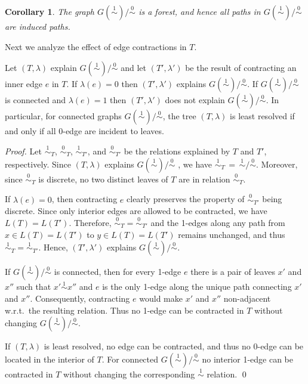 \documentclass[smallextended]{svjour3}
\newcommand{\rev}[1]{\begingroup\color{blue}#1\endgroup}
\newcommand{\Ro}{\mathrel{\overset{0}{\sim}}}
\newcommand{\Rl}{\mathrel{\overset{1}{\sim}}}
\newtheorem{cor}[thm]{Corollary}
\begin{document}
\begin{cor}
  The graph $G(\Rl)/\Ro$ is a forest, and hence all paths in $G(\Rl)/\Ro$
  are induced paths.
  \label{cor:cycle-free}
\end{cor}

Next we analyze the effect of edge contractions in $T$.

\begin{lemma}
  Let $(T,\lambda)$ explain $G(\Rl)/\Ro$ and let $(T',\lambda')$ be the
  result of contracting an \rev{inner} edge  $e$ in $T$. If $\lambda(e)=0$
  then $(T',\lambda')$ explains $G(\Rl)/\Ro$. If $G(\Rl)/\Ro$ is connected
  and $\lambda(e)=1$ then $(T',\lambda')$ does not explain $G(\Rl)/\Ro$.
  In particular, for connected graphs $G(\Rl)/\Ro$, the tree $(T,\lambda)$
  is least resolved if and only if all 0-edge are incident to leaves.
\end{lemma}
\begin{proof}
  Let $\Rl_T$, $\Ro_T$, $\Rl_{T'}$, and $\Ro_{T'}$ be the relations
  explained by $T$ and $T'$, respectively.  Since $(T,\lambda)$ explains
  $G(\Rl)/\Ro$ , we have $\Rl_T\,=\,\Rl/\Ro$. Moreover, since $\Ro_T$ is
  discrete, no two distinct leaves of $T$ are in relation $\Ro_T$.

  If $\lambda(e)=0$, then contracting $e$ clearly preserves the property of
  $\Ro_{T'}$ being discrete.  Since only interior edges are allowed to be
  contracted, we have $L(T)=L(T')$. Therefore, $\Ro_T =\Ro_{T'}$ and the
  1-edges along any path from $x\in L(T)=L(T')$ to $y\in L(T)=L(T')$
  remains unchanged, and thus $\Rl_T=\Rl_{T'}$.  Hence, $(T',\lambda')$
  explains $G(\Rl)/\Ro$.

  If $G(\Rl)/\Ro$ is connected, then for every 1-edge $e$ there is a pair
  of leaves $x'$ and $x''$ such that $x'\Rl x''$ and $e$ is the only 1-edge
  along the unique path connecting $x'$ and $x''$. Consequently,
  contracting $e$ would make $x'$ and $x''$ non-adjacent w.r.t.\ the
  resulting relation.  Thus no 1-edge can be contracted in $T$ without
  changing $G(\Rl)/\Ro$.

  If $(T,\lambda)$ is least resolved, no edge can be contracted, and thus
  no 0-edge can be located in the interior of $T$. For connected
  $G(\Rl)/\Ro$ no interior 1-edge can be contracted in $T$ without changing
  the corresponding $\Rl$ relation. \qed
\end{proof}
\end{document}
